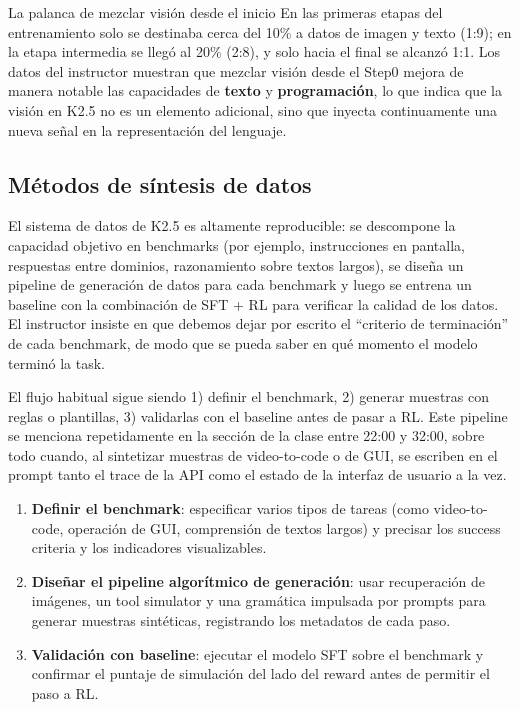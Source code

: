 \documentclass[a4paper]{article}
\begin{document}
\begin{importantbox}{La palanca de mezclar visión desde el inicio}
En las primeras etapas del entrenamiento solo se destinaba cerca del 10\% a datos de imagen y texto (1:9); en la etapa intermedia se llegó al 20\% (2:8), y solo hacia el final se alcanzó 1:1. Los datos del instructor muestran que mezclar visión desde el Step0 mejora de manera notable las capacidades de \textbf{texto} y \textbf{programación}, lo que indica que la visión en K2.5 no es un elemento adicional, sino que inyecta continuamente una nueva señal en la representación del lenguaje.
\end{importantbox}

\subsection{Métodos de síntesis de datos}
El sistema de datos de K2.5 es altamente reproducible: se descompone la capacidad objetivo en benchmarks (por ejemplo, instrucciones en pantalla, respuestas entre dominios, razonamiento sobre textos largos), se diseña un pipeline de generación de datos para cada benchmark y luego se entrena un baseline con la combinación de SFT + RL para verificar la calidad de los datos. El instructor insiste en que debemos dejar por escrito el ``criterio de terminación'' de cada benchmark, de modo que se pueda saber en qué momento el modelo terminó la task.

El flujo habitual sigue siendo 1) definir el benchmark, 2) generar muestras con reglas o plantillas, 3) validarlas con el baseline antes de pasar a RL. Este pipeline se menciona repetidamente en la sección de la clase entre 22:00 y 32:00, sobre todo cuando, al sintetizar muestras de video-to-code o de GUI, se escriben en el prompt tanto el trace de la API como el estado de la interfaz de usuario a la vez.

\begin{enumerate}
    \item \textbf{Definir el benchmark}: especificar varios tipos de tareas (como video-to-code, operación de GUI, comprensión de textos largos) y precisar los success criteria y los indicadores visualizables.
    \item \textbf{Diseñar el pipeline algorítmico de generación}: usar recuperación de imágenes, un tool simulator y una gramática impulsada por prompts para generar muestras sintéticas, registrando los metadatos de cada paso.
    \item \textbf{Validación con baseline}: ejecutar el modelo SFT sobre el benchmark y confirmar el puntaje de simulación del lado del reward antes de permitir el paso a RL.
\end{enumerate}
\end{document}
